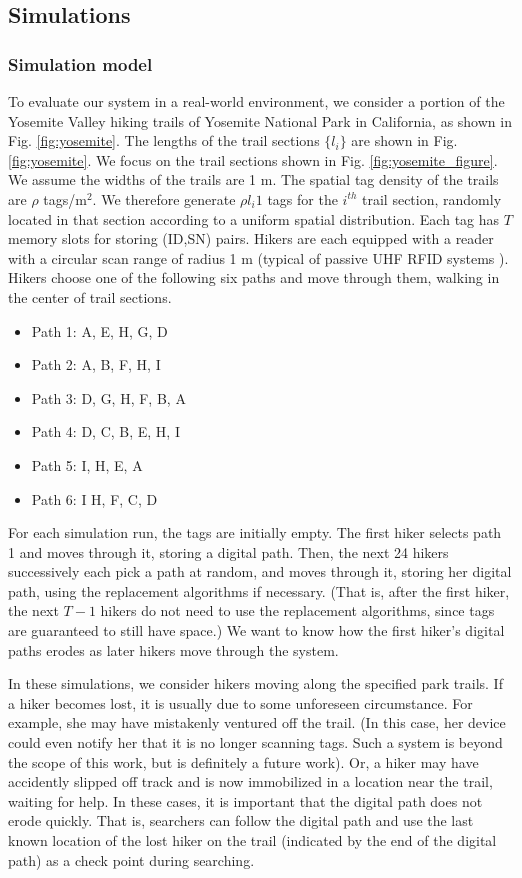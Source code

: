 \documentclass[conference]{IEEEtran}
\begin{document}
\subsection{Simulations}

\subsubsection{Simulation model}
To evaluate our system in a real-world environment, we consider a portion of the Yosemite Valley hiking trails \cite{web:yosemite} of Yosemite National Park in California, as shown in Fig. \ref{fig:yosemite}.  The lengths of the trail sections $\{l_i\}$ are shown in Fig. \ref{fig:yosemite}.  We focus on the trail sections shown in Fig. \ref{fig:yosemite_figure}.  We assume the widths of the trails are 1 m.  The spatial tag density of the trails are $\rho$ tags/m$^2$.  We therefore generate $\rho l_i 1$ tags for the $i^{th}$ trail section, randomly located in that section according to a uniform spatial distribution.  Each tag has $T$ memory slots for storing (ID,SN) pairs.  Hikers are each equipped with a reader with a circular scan range of radius 1 m (typical of passive UHF RFID systems \cite{book:rfidhandbook}).  Hikers choose one of the following six paths and move through them, walking in the center of trail sections.
\begin{itemize}
\item Path 1: A, E, H, G, D
\item Path 2: A, B, F, H, I
\item Path 3: D, G, H, F, B, A
\item Path 4: D, C, B, E, H, I
\item Path 5: I, H, E, A
\item Path 6: I H, F, C, D
\end{itemize}

For each simulation run, the tags are initially empty.  The first hiker selects path 1 and moves through it, storing a digital path.  Then, the next 24 hikers successively each pick a path at random, and moves through it, storing her digital path, using the replacement algorithms if necessary.  (That is, after the first hiker, the next $T-1$ hikers do not need to use the replacement algorithms, since tags are guaranteed to still have space.)  We want to know how the first hiker's digital paths erodes as later hikers move through the system.

In these simulations, we consider hikers moving along the specified park trails.  If a hiker becomes lost, it is usually due to some unforeseen circumstance.  For example, she may have mistakenly ventured off the trail.  (In this case, her device could even notify her that it is no longer scanning tags.  Such a system is beyond the scope of this work, but is definitely a future work).  Or, a hiker may have accidently slipped off track and is now immobilized in a location near the trail, waiting for help.  In these cases, it is important that the digital path does not erode quickly.  That is, searchers can follow the digital path and use the last known location of the lost hiker on the trail (indicated by the end of the digital path) as a check point during searching.
\end{document}
